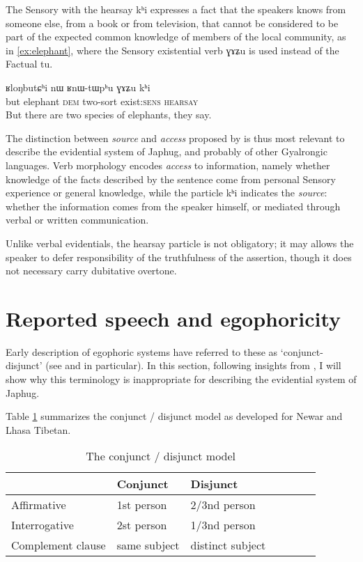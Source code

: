 \documentclass[oldfontcommands,oneside,a4paper,11pt]{article}
\newcommand{\ipa}[1]{{\phon \mbox{#1}}} %
\begin{document}
  The Sensory with the hearsay \ipa{kʰi} expresses a fact that the speakers knows from someone else, from  a book or from television, that cannot be considered to be part of the expected common knowledge of members of the local community, as in \ref{ex:elephant}, where the Sensory existential verb \ipa{ɣɤʑu} is used instead of the Factual \ipa{tu}.
  
   \begin{exe}
\ex \label{ex:elephant}
\gll   \ipa{tɕeri}  	\ipa{ʁloŋbutɕʰi}  	\ipa{nɯ}  	\ipa{ʁnɯ-tɯpʰu}  	\ipa{ɣɤʑu}  	\ipa{kʰi}  \\
  but elephant \textsc{dem} two-sort exist:\textsc{sens} \textsc{hearsay} \\
\glt But there are two species of elephants, they say.
\end{exe} 

The distinction between \textit{source} and \textit{access}  proposed by \citet{tournadre14evidentiality} is thus most relevant to describe the evidential system of Japhug, and probably of other Gyalrongic languages. Verb morphology encodes \textit{access} to information, namely whether knowledge of the facts described by the sentence come from personal Sensory experience or general knowledge, while the particle \ipa{kʰi} indicates the \textit{source}: whether the information comes from the speaker himself, or mediated through verbal or written communication.

Unlike verbal evidentials, the hearsay particle is not obligatory; it may allows the speaker to defer responsibility of the truthfulness of the assertion,  though it does not necessary carry dubitative overtone.

\section{Reported speech and egophoricity}  
Early description of egophoric systems have referred to these as `conjunct-disjunct'  (see \citet{hale80conjunct} and \citet{delancey90erg} in particular). In this section, following insights from   \citet{tournadre08conjunct}, I will show why this terminology is inappropriate for describing the evidential system of Japhug.

 Table \ref{tab:conjunct} summarizes the conjunct / disjunct model as developed for Newar and Lhasa Tibetan. 

\begin{table}[H]
\caption{The conjunct / disjunct model} \label{tab:conjunct} \centering
\begin{tabular}{lllllll}
\toprule
& Conjunct & Disjunct \\
\midrule
Affirmative & 1st person & 2/3nd person \\
Interrogative & 2st person & 1/3nd person \\
Complement clause & same subject & distinct subject \\
\bottomrule
\end{tabular}
\end{table}
  
\end{document}
